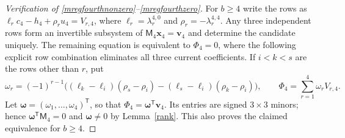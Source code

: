 \documentclass[10pt,a4paper]{amsart}
\begin{document}
\begin{proof}[Verification of \eqref{mregfourthnonzero}--\eqref{mregfourthzero}]
For $b\ge4$ write the rows as
$\ell_rc_4-h_4+\rho_ru_4=V_{r,4}$, where
$\ell_r=\lambda_r^{4,0}$ and $\rho_r=-\lambda_r^{4,4}$.
Any three independent rows form an invertible subsystem of
$\mathsf M_4\mathbf x_4=\mathbf v_4$ and determine the candidate uniquely.  The remaining equation is equivalent
to $\Phi_4=0$, where the following explicit row combination eliminates
all three current coefficients.  If $i<k<s$ are the rows other than
$r$, put
\[
 \omega_r=(-1)^{r-1}
 \bigl((\ell_k-\ell_i)(\rho_s-\rho_i)
             -(\ell_s-\ell_i)(\rho_k-\rho_i)\bigr),
 \qquad
 \Phi_4=\sum_{r=1}^{4}\omega_rV_{r,4}.
\]
Let $\boldsymbol\omega=(\omega_1,\ldots,\omega_4)^{\mathsf T}$,
so that $\Phi_4=\boldsymbol\omega^{\mathsf T}\mathbf v_4$.
Its entries are signed $3\times3$ minors; hence
$\boldsymbol\omega^{\mathsf T}\mathsf M_4=0$ and
$\boldsymbol\omega\ne0$ by Lemma~\ref{rank}.
This also proves the claimed equivalence for $b\ge4$.


\end{proof}
\end{document}
